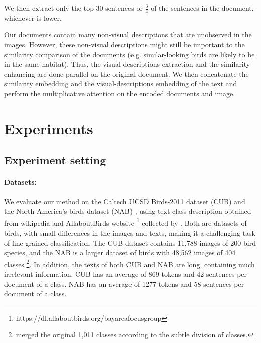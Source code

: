 \documentclass[11pt,a4paper]{article}
\begin{document}
 We then extract only the top 30 sentences or $\frac{3}{4}$ of the sentences in the document, whichever is lower.\par   

\par




Our documents contain many non-visual descriptions that are unobserved in the images. However, these non-visual descriptions might still be important to the similarity comparison of the documents (e.g. similar-looking birds are likely to be in the same habitat). Thus, the visual-descriptions extraction and the similarity enhancing are done parallel on the original document. We then concatenate the similarity embedding and the visual-descriptions embedding of the text and perform the multiplicative attention on the encoded documents and image.

\section{Experiments}

\subsection{Experiment setting}

\paragraph{Datasets:}  We evaluate our method on the Caltech UCSD Birds-2011 dataset (CUB) \citet{wah2011caltech} and the North America’s birds dataset (NAB) \cite{van2015building}, using text class description obtained from wikipedia and AllaboutBirds website \footnote{https://dl.allaboutbirds.org/bayareafocusgroup} collected by \citet{elhoseiny2017link}. 
Both are datasets of birds, with small differences in the images and texts, making it a challenging task of fine-grained classification. The CUB dataset contains 11,788 images of 200 bird species, and the NAB
is a larger dataset of birds with 48,562 images of 404 classes \footnote{\citet{elhoseiny2017link} merged the original 1,011 classes according to the subtle division of classes.}.
In addition, the texts of both CUB and NAB are long, containing much irrelevant information. CUB has an average of 869 tokens and 42 sentences per document of a class. NAB has an average of 1277 tokens and 58 sentences per document of a class. 
\end{document}
